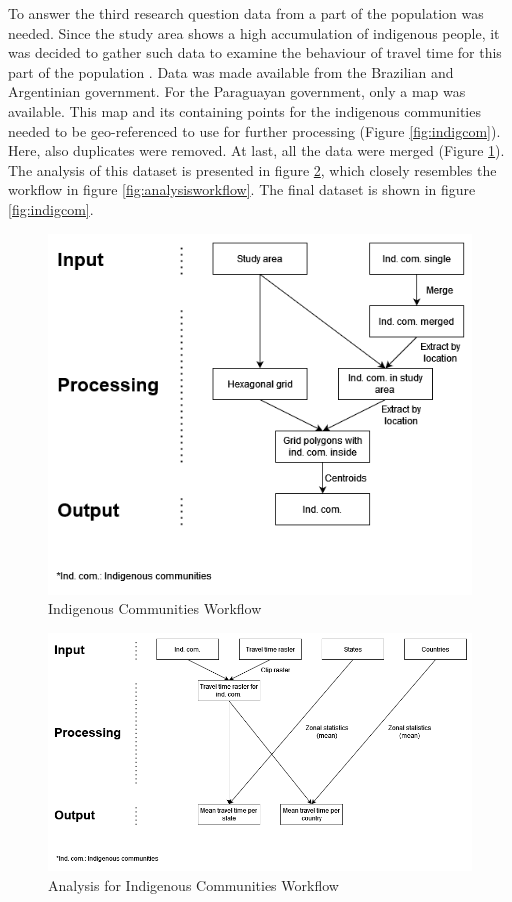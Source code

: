 \documentclass[11pt, a4paper]{report}
\begin{document}
To answer the third research question data from a part of the population was needed. Since the study area shows a high accumulation of indigenous people, it was decided to gather such data to examine the behaviour of travel time for this part of the population \citep{berger_indigenous_2024}. Data was made available from the Brazilian and Argentinian government. For the Paraguayan government, only a map was available. This map and its containing points for the indigenous communities needed to be geo-referenced to use for further processing (Figure \ref{fig:indigcom}). Here, also duplicates were removed. At last, all the data were merged (Figure \ref{fig:indcomworkflow}). The analysis of this dataset is presented in figure \ref{fig:analysisindcomworkflow}, which closely resembles the workflow in figure \ref{fig:analysisworkflow}. The final dataset is shown in figure \ref{fig:indigcom}.

\begin{figure}[H]
  \centering
  \includegraphics[width=0.9\linewidth]{figures/indcomworkflow.png}
  \caption{Indigenous Communities Workflow}
  \label{fig:indcomworkflow}
\end{figure}

\begin{figure}[H]
  \centering
  \includegraphics[width=0.9\linewidth]{figures/icanalysisworkflow.png}
  \caption{Analysis for Indigenous Communities Workflow}
  \label{fig:analysisindcomworkflow}
\end{figure}
\end{document}
